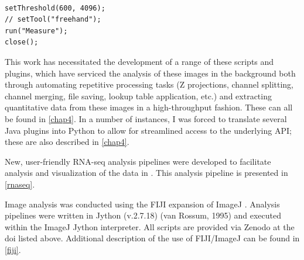\begin{lstlisting}

setThreshold(600, 4096);
// setTool("freehand");
run("Measure");
close();

\end{lstlisting}

This work has necessitated the development of a range of these scripts and plugins, which have serviced the analysis of these images in the background both through automating repetitive processing tasks (Z projections, channel splitting, channel merging, file saving, lookup table application, etc.) and extracting quantitative data from these images in a high-throughput fashion. These can all be found in \autoref{chap4}. In a number of instances, I was forced to translate several Java plugins into Python to allow for streamlined access to the underlying API; these are also described in \autoref{chap4}.

New, user-friendly RNA-seq analysis pipelines were developed to facilitate analysis and visualization of the data in \citet{Saelens2022}. This analysis pipeline is presented in \autoref{rnaseq}.

Image analysis was conducted using the FIJI \citep{Schindelin2012, Rueden2017} expansion of ImageJ \citep{Schneider2012}. Analysis pipelines were written in Jython (v.2.7.18) (van Rossum, 1995) and executed within the ImageJ Jython interpreter. All scripts are provided via Zenodo at the doi listed above. Additional description of the use of FIJI/ImageJ can be found in \autoref{fiji}.

